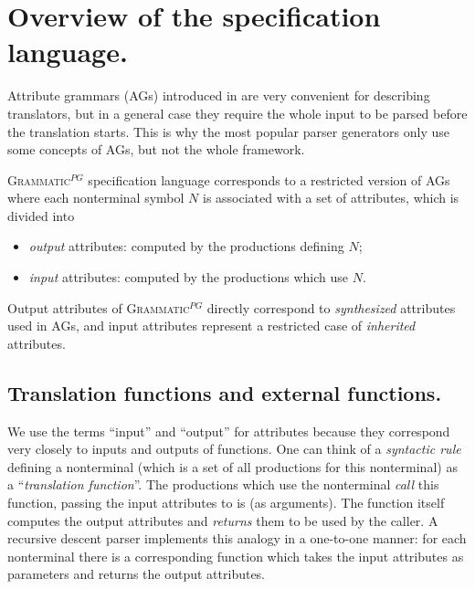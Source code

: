 \documentclass{informat} %
\newcommand{\ATF}{\textsc{Grammatic}$^{PG}$}
\begin{document}

\section{Overview of the specification language.}\label{Overview}

Attribute grammars (AGs) introduced in \cite{ATG} are very convenient for describing translators, but in a general case they require the whole input to be parsed before the translation starts. This is why the most popular parser generators only use some concepts of AGs, but not the whole framework.

\ATF{} specification language corresponds to a restricted version of AGs where each nonterminal symbol $N$ is associated with a set of attributes, which is divided into
\begin{itemize}
	\item \emph{output} attributes: computed by the productions defining $N$;
	\item \emph{input} attributes: computed by the productions which use $N$.
\end{itemize}
Output attributes of \ATF{} directly correspond to \emph{synthesized} attributes used in AGs, and input attributes represent a restricted case of \emph{inherited} attributes. 

\subsection{Translation functions and external functions.}

We use the terms ``input'' and ``output'' for attributes because they correspond very closely to inputs and outputs of functions. One can think of a \emph{syntactic rule} defining a nonterminal (which is a set of all productions for this nonterminal) as a ``\emph{translation function}''. The productions which use the nonterminal \emph{call} this function, passing the input attributes to is (as arguments). The function itself computes the output attributes and \emph{returns} them to be used by the caller. A recursive descent parser implements this analogy in a one-to-one manner: for each nonterminal there is a corresponding function which takes the input attributes as parameters and returns the output attributes. 
\end{document}
